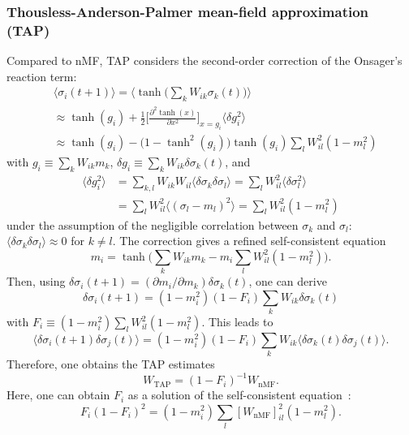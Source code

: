 \documentclass[prx,twocolumn,twoside,showpacs,superscriptaddress]{revtex4-1}
\begin{document}
\subsubsection*{Thousless-Anderson-Palmer mean-field approximation (TAP)} 
Compared to nMF, TAP considers the second-order correction of the Onsager's reaction term:
\begin{align}
\label{eq:TAP}
&\langle \sigma_i(t+1) \rangle = \big\langle \tanh \big( \sum_k W_{ik} \sigma_k(t) \big) \big\rangle \nonumber \\
&\approx \tanh(g_i) + \frac{1}{2} \bigg[ \frac{\partial^2 \tanh (x)}{\partial x^2} \bigg]_{x=g_i} \langle \delta g_i^2 \rangle \nonumber \\
&\approx \tanh(g_i) - \big( 1 - \tanh^2(g_i) \big) \tanh (g_i) \sum_l W_{il}^2 (1-m_l^2) 
\end{align}
with $g_i \equiv \sum_k W_{ik} m_k$, $\delta g_i \equiv \sum_k W_{ik} \delta \sigma_k(t)$, and
\begin{align}
\label{eq:variance}
\langle \delta g_i^2 \rangle &= \sum_{k,l} W_{ik} W_{il} \langle \delta \sigma_k \delta \sigma_l \rangle = \sum_l W_{il}^2 \langle \delta \sigma_l^2 \rangle\nonumber \\
&= \sum_l W_{il}^2 \langle (\sigma_l - m_l)^2 \rangle = \sum_l W_{il}^2  (1-m_l^2)
\end{align}
under the assumption of the negligible correlation between $\sigma_k$ and $\sigma_l$: $\langle \delta \sigma_k \delta \sigma_l \rangle\approx0$ for $k \neq l$.
The correction gives a refined self-consistent equation
\begin{equation}
\label{eq:TAP2}
m_i = \tanh \big( \sum_k W_{ik} m_k - m_i \sum_l W_{il}^2 (1-m_l^2) \big).
\end{equation}
Then, using $\delta \sigma_i (t+1) = (\partial m_i/\partial m_k) \delta \sigma_k(t)$, one can derive
\begin{equation}
\delta \sigma_i(t+1) = (1-m_i^2) (1-F_i) \sum_k W_{ik} \delta \sigma_k(t)
\end{equation}
with $F_i \equiv (1-m_i^2) \sum_l W_{il}^2 (1-m_l^2)$. This leads to
\begin{equation}
\langle \delta \sigma_i(t+1) \delta \sigma_j(t) \rangle = (1-m_i^2)(1-F_i) \sum_k W_{ik} \langle \delta \sigma_k(t) \delta \sigma_j(t) \rangle.
\end{equation}
Therefore, one obtains the TAP estimates
\begin{equation}
W_{\text{TAP}} = (1-F_i)^{-1} W_{\text{nMF}}.
\end{equation}
Here, one can obtain $F_i$ as a solution of the self-consistent equation~\cite{Roudi2011}:
\begin{equation}
F_i (1-F_i)^2 = (1-m_i^2) \sum_l [W_{\text{nMF}}]_{il}^2 (1-m_l^2). 
\end{equation}
\end{document}
